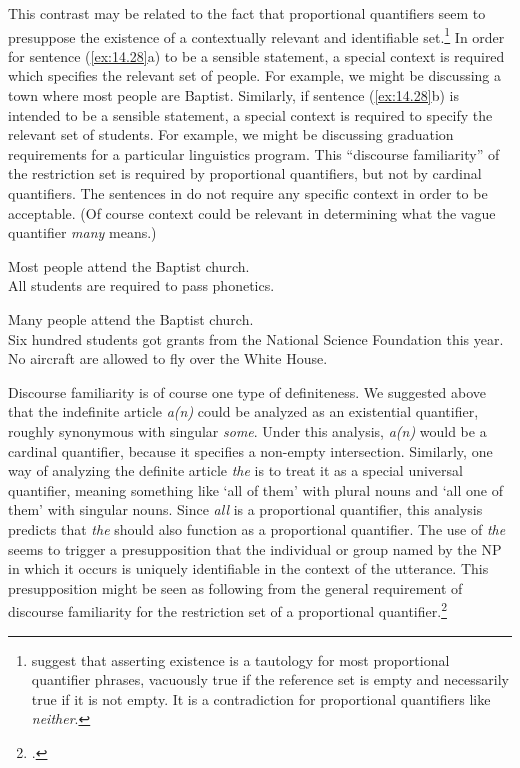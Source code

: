 This contrast may be related to the fact that proportional quantifiers seem to presuppose the existence of a contextually relevant and identifiable set.\footnote{\citet{BarwiseCooper1981} suggest that asserting existence is a tautology for most proportional quantifier phrases, vacuously true if the reference set is empty and necessarily true if it is not empty. It is a contradiction for proportional quantifiers like \textit{neither}.} In order for sentence (\ref{ex:14.28}a) to be a sensible statement, a special context is required which specifies the relevant set of people. For example, we might be discussing a town where most people are Baptist. Similarly, if sentence (\ref{ex:14.28}b) is intended to be a sensible statement, a special context is required to specify the relevant set of students. For example, we might be discussing graduation requirements for a particular linguistics program. This “discourse familiarity” of the restriction set is required by proportional quantifiers, but not by cardinal quantifiers. The sentences in  do not require any specific context in order to be acceptable. (Of course context could be relevant in determining what the vague quantifier \textit{many} means.)


\ea \label{ex:14.28}
\ea Most people attend the Baptist church.\\
\ex All students are required to pass phonetics.
                       \z
\z

\ea \label{ex:14.29}
\ea Many people attend the Baptist church.\\
\ex Six hundred students got grants from the National Science Foundation this year.\\
\ex No aircraft are allowed to fly over the White House.
                       \z
\z


Discourse familiarity is of course one type of definiteness. We suggested above that the indefinite article \textit{a(n)} could be analyzed as an existential quantifier, roughly synonymous with singular \textit{some}. Under this analysis, \textit{a(n)} would be a cardinal quantifier, because it specifies a non-empty intersection. Similarly, one way of analyzing the definite article \textit{the} is to treat it as a special universal quantifier, meaning something like ‘all of them’ with plural nouns and ‘all one of them’ with singular nouns. Since \textit{all} is a proportional quantifier, this analysis predicts that \textit{the} should also function as a proportional quantifier. The use of \textit{the} seems to trigger a presupposition that the individual or group named by the NP in which it occurs is uniquely identifiable in the context of the utterance. This presupposition might be seen as following from the general requirement of discourse familiarity for the restriction set of a proportional quantifier.\footnote{\citet{Kearns2000}.}



